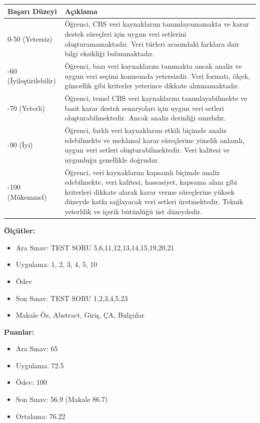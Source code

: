 \documentclass[12pt,a4paper]{article}
\begin{document}
\vspace{0.5cm}
\begin{longtable}{p{3cm}p{12cm}}
\toprule
\textbf{Başarı Düzeyi} & \textbf{Açıklama} \\
\midrule
0-50 (Yetersiz) & Öğrenci, CBS veri kaynaklarını tanımlayamamakta ve karar destek süreçleri için uygun veri setlerini oluşturamamaktadır. Veri türleri arasındaki farklara dair bilgi eksikliği bulunmaktadır. \\
\addlinespace
50-60 (İyileştirilebilir) & Öğrenci, bazı veri kaynaklarını tanımakta ancak analiz ve uygun veri seçimi konusunda yetersizdir. Veri formatı, ölçek, güncellik gibi kriterler yeterince dikkate alınmamaktadır. \\
\addlinespace
60-70 (Yeterli) & Öğrenci, temel CBS veri kaynaklarını tanımlayabilmekte ve basit karar destek senaryoları için uygun veri setleri oluşturabilmektedir. Ancak analiz derinliği sınırlıdır. \\
\addlinespace
70-90 (İyi) & Öğrenci, farklı veri kaynaklarını etkili biçimde analiz edebilmekte ve mekânsal karar süreçlerine yönelik anlamlı, uygun veri setleri oluşturabilmektedir. Veri kalitesi ve uygunluğu genellikle doğrudur. \\
\addlinespace
90-100 (Mükemmel) & Öğrenci, veri kaynaklarını kapsamlı biçimde analiz edebilmekte, veri kalitesi, hassasiyet, kapsama alanı gibi kriterleri dikkate alarak karar verme süreçlerine yüksek düzeyde katkı sağlayacak veri setleri üretmektedir. Teknik yeterlilik ve içerik bütünlüğü üst düzeydedir. \\
\bottomrule
\end{longtable}

\vspace{0.5cm}
\textbf{Ölçütler:} 
\begin{itemize}
    \item Ara Sınav: TEST SORU 5,6,11,12,13,14,15,19,20,21
    \item Uygulama: 1, 2, 3, 4, 5, 10
    \item Ödev
    \item Son Sınav: TEST SORU 1,2,3,4,5,23
    \item Makale Öz, Abstract, Giriş, ÇA, Bulgular
\end{itemize}

\textbf{Puanlar:} 
\begin{itemize}
    \item Ara Sınav: 65
    \item Uygulama: 72.5
    \item Ödev: 100
    \item Son Sınav: 56.9 (Makale 86.7)
    \item Ortalama: 76.22
\end{itemize}
\end{document}
